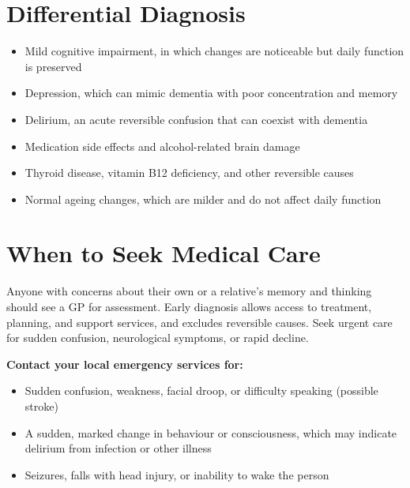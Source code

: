 \section*{Differential Diagnosis}
\begin{itemize}
    \item Mild cognitive impairment, in which changes are noticeable but daily function is preserved
    \item Depression, which can mimic dementia with poor concentration and memory
    \item Delirium, an acute reversible confusion that can coexist with dementia
    \item Medication side effects and alcohol-related brain damage
    \item Thyroid disease, vitamin B12 deficiency, and other reversible causes
    \item Normal ageing changes, which are milder and do not affect daily function
\end{itemize}

\section*{When to Seek Medical Care}
Anyone with concerns about their own or a relative's memory and thinking should see a GP for assessment. Early diagnosis allows access to treatment, planning, and support services, and excludes reversible causes. Seek urgent care for sudden confusion, neurological symptoms, or rapid decline.

\textbf{Contact your local emergency services for:}
\begin{itemize}
    \item Sudden confusion, weakness, facial droop, or difficulty speaking (possible stroke)
    \item A sudden, marked change in behaviour or consciousness, which may indicate delirium from infection or other illness
    \item Seizures, falls with head injury, or inability to wake the person
\end{itemize}

